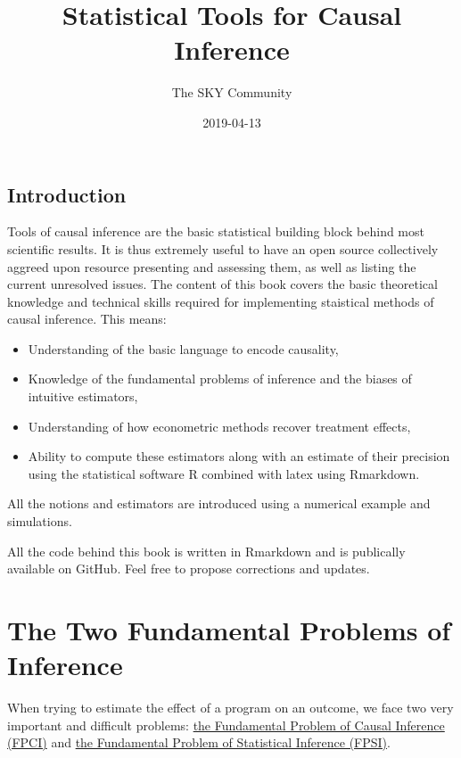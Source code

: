 \documentclass[]{book}
\title{Statistical Tools for Causal Inference}
\author{The SKY Community}
\date{2019-04-13}
\providecommand{\tightlist}{%
  \setlength{\itemsep}{0pt}\setlength{\parskip}{0pt}}
\theoremstyle{definition}
\theoremstyle{definition}
\theoremstyle{definition}
\theoremstyle{remark}
\begin{document}
\maketitle

{
\setcounter{tocdepth}{1}
\tableofcontents
}
\chapter*{Introduction}\label{introduction}

Tools of causal inference are the basic statistical building block
behind most scientific results. It is thus extremely useful to have an
open source collectively aggreed upon resource presenting and assessing
them, as well as listing the current unresolved issues. The content of
this book covers the basic theoretical knowledge and technical skills
required for implementing staistical methods of causal inference. This
means:

\begin{itemize}
\tightlist
\item
  Understanding of the basic language to encode causality,
\item
  Knowledge of the fundamental problems of inference and the biases of
  intuitive estimators,
\item
  Understanding of how econometric methods recover treatment effects,
\item
  Ability to compute these estimators along with an estimate of their
  precision using the statistical software R combined with latex using
  Rmarkdown.
\end{itemize}

All the notions and estimators are introduced using a numerical example
and simulations.

All the code behind this book is written in Rmarkdown and is publically
available on GitHub. Feel free to propose corrections and updates.

\part{The Two Fundamental Problems of
Inference}\label{part-the-two-fundamental-problems-of-inference}

When trying to estimate the effect of a program on an outcome, we face
two very important and difficult problems: \href{FPCI.html}{the
Fundamental Problem of Causal Inference (FPCI)} and \href{FPSI.html}{the
Fundamental Problem of Statistical Inference (FPSI)}.
\end{document}
